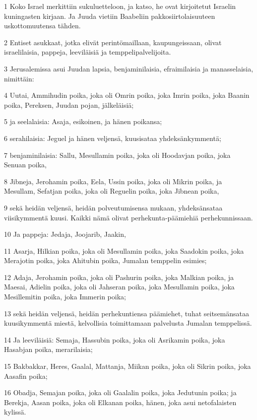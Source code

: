 \par 1 Koko Israel merkittiin sukuluetteloon, ja katso, he ovat kirjoitetut Israelin kuningasten kirjaan. Ja Juuda vietiin Baabeliin pakkosiirtolaisuuteen uskottomuutensa tähden.
\par 2 Entiset asukkaat, jotka elivät perintömaillaan, kaupungeissaan, olivat israelilaisia, pappeja, leeviläisiä ja temppelipalvelijoita.
\par 3 Jerusalemissa asui Juudan lapsia, benjaminilaisia, efraimilaisia ja manasselaisia, nimittäin:
\par 4 Uutai, Ammihudin poika, joka oli Omrin poika, joka Imrin poika, joka Baanin poika, Pereksen, Juudan pojan, jälkeläisiä;
\par 5 ja seelalaisia: Asaja, esikoinen, ja hänen poikansa;
\par 6 serahilaisia: Jeguel ja hänen veljensä, kuusisataa yhdeksänkymmentä;
\par 7 benjaminilaisia: Sallu, Mesullamin poika, joka oli Hoodavjan poika, joka Senuan poika,
\par 8 Jibneja, Jerohamin poika, Eela, Ussin poika, joka oli Mikrin poika, ja Mesullam, Sefatjan poika, joka oli Reguelin poika, joka Jibnean poika,
\par 9 sekä heidän veljensä, heidän polveutumisensa mukaan, yhdeksänsataa viisikymmentä kuusi. Kaikki nämä olivat perhekunta-päämiehiä perhekunnissaan.
\par 10 Ja pappeja: Jedaja, Joojarib, Jaakin,
\par 11 Asarja, Hilkian poika, joka oli Mesullamin poika, joka Saadokin poika, joka Merajotin poika, joka Ahitubin poika, Jumalan temppelin esimies;
\par 12 Adaja, Jerohamin poika, joka oli Pashurin poika, joka Malkian poika, ja Maesai, Adielin poika, joka oli Jahseran poika, joka Mesullamin poika, joka Mesillemitin poika, joka Immerin poika;
\par 13 sekä heidän veljensä, heidän perhekuntiensa päämiehet, tuhat seitsemänsataa kuusikymmentä miestä, kelvollisia toimittamaan palvelusta Jumalan temppelissä.
\par 14 Ja leeviläisiä: Semaja, Hassubin poika, joka oli Asrikamin poika, joka Hasabjan poika, merarilaisia;
\par 15 Bakbakkar, Heres, Gaalal, Mattanja, Miikan poika, joka oli Sikrin poika, joka Aasafin poika;
\par 16 Obadja, Semajan poika, joka oli Gaalalin poika, joka Jedutunin poika; ja Berekja, Aasan poika, joka oli Elkanan poika, hänen, joka asui netofalaisten kylissä.
